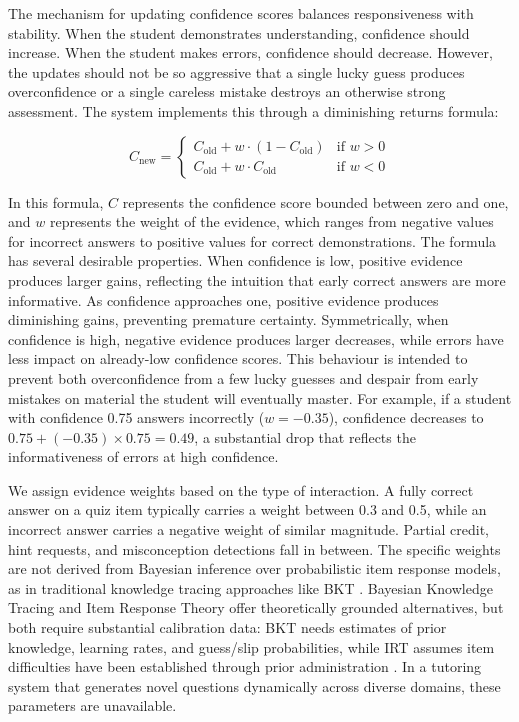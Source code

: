 \documentclass[logo,bsc,singlespacing,parskip,online]{infthesis}
\begin{document}
The mechanism for updating confidence scores balances responsiveness with stability. When the student demonstrates understanding, confidence should increase. When the student makes errors, confidence should decrease. However, the updates should not be so aggressive that a single lucky guess produces overconfidence or a single careless mistake destroys an otherwise strong assessment. The system implements this through a diminishing returns formula:

\begin{equation}
C_{\text{new}} = \begin{cases}
C_{\text{old}} + w \cdot (1 - C_{\text{old}}) & \text{if } w > 0 \\
C_{\text{old}} + w \cdot C_{\text{old}} & \text{if } w < 0
\end{cases}
\end{equation}

In this formula, $C$ represents the confidence score bounded between zero and one, and $w$ represents the weight of the evidence, which ranges from negative values for incorrect answers to positive values for correct demonstrations. The formula has several desirable properties. When confidence is low, positive evidence produces larger gains, reflecting the intuition that early correct answers are more informative. As confidence approaches one, positive evidence produces diminishing gains, preventing premature certainty. Symmetrically, when confidence is high, negative evidence produces larger decreases, while errors have less impact on already-low confidence scores. This behaviour is intended to prevent both overconfidence from a few lucky guesses and despair from early mistakes on material the student will eventually master. For example, if a student with confidence 0.75 answers incorrectly ($w = -0.35$), confidence decreases to $0.75 + (-0.35) \times 0.75 = 0.49$, a substantial drop that reflects the informativeness of errors at high confidence.

We assign evidence weights based on the type of interaction. A fully correct answer on a quiz item typically carries a weight between 0.3 and 0.5, while an incorrect answer carries a negative weight of similar magnitude. Partial credit, hint requests, and misconception detections fall in between. The specific weights are not derived from Bayesian inference over probabilistic item response models, as in traditional knowledge tracing approaches like BKT \citep{corbett1994bkt}. Bayesian Knowledge Tracing and Item Response Theory offer theoretically grounded alternatives, but both require substantial calibration data: BKT needs estimates of prior knowledge, learning rates, and guess/slip probabilities, while IRT assumes item difficulties have been established through prior administration \citep{embretson2000irt}. In a tutoring system that generates novel questions dynamically across diverse domains, these parameters are unavailable.
\end{document}
